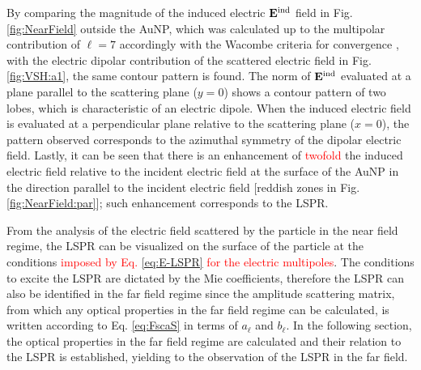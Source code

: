 By comparing the magnitude of the induced electric $\vb{E}^\text{ind}$ field in Fig. \ref{fig:NearField} outside the AuNP, which was calculated up to  the multipolar contribution of $\ell = 7$ accordingly with the Wacombe criteria for convergence \cite{bohren_absorption_1983}, with the electric dipolar contribution of the scattered electric field in Fig. \ref{fig:VSH:a1}, the same contour pattern is found. The norm of $\vb{E}^\text{ind}$ evaluated at a plane parallel to the scattering plane ($y=0$) shows a contour pattern of two lobes, which is characteristic of an electric dipole. When the induced electric field is evaluated at a perpendicular plane relative to the scattering plane ($x = 0$), the pattern observed corresponds to the azimuthal symmetry of the dipolar electric field. Lastly, it can be seen that there is an enhancement of \textcolor{red}{twofold} the induced electric field relative to the incident electric field at the surface of the AuNP in the direction parallel to the incident  electric field  [reddish zones in Fig. \ref{fig:NearField:par}]; such enhancement corresponds to the LSPR.

From the analysis of the electric field scattered by the particle in the near field regime, the LSPR can be visualized on the surface of the particle at the conditions \textcolor{red}{imposed by Eq. \eqref{eq:E-LSPR}  for the electric multipoles}. The conditions to excite the LSPR are dictated by the Mie coefficients, therefore the LSPR can also be identified in the far field regime since the amplitude scattering matrix, from which  any optical properties in the far field regime can be calculated, is written according to Eq. \eqref{eq:FscaS} in terms of $a_\ell$ and $b_\ell$. In the following section, the optical properties in the far field regime are calculated and their relation to the LSPR is established, yielding to the observation of the LSPR in the far field.
